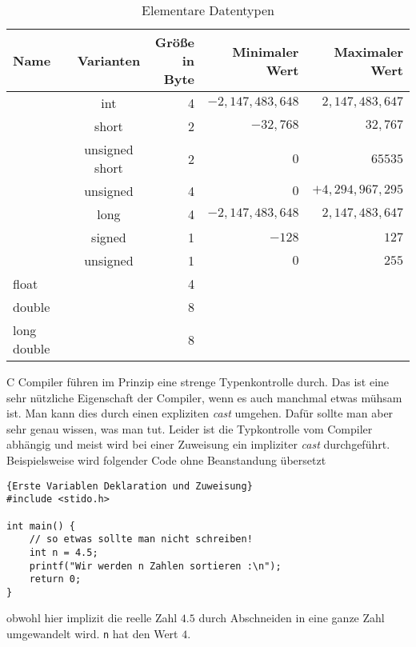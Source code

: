 \begin{table}[t]
\caption{Elementare Datentypen\label{tabelle1}}  %
\centering
\begin{tabular}{|l c c rrr|}
\hline
Name & & Varianten & Größe in Byte & Minimaler Wert & Maximaler Wert
\\[0.5ex]   
\hline %
                       & & int &4 & $-2,147,483,648$ & $2,147,483,647$ \\[-0.0ex]
                       & & short & 2 & $-32,768$ & $32,767$ \\[-0.0ex]
\raisebox{1ex}{int}  & & unsigned short& 2 & $0$ & $65535$ \\[-0.0ex]
                       & &unsigned& 4 & $0$ & $ +4,294,967,295$ \\[1ex]
                       & &long& 4 &  $-2,147,483,648$ & $2,147,483,647$ \\
\hline
                            & &signed & 1 & $-128$ & $127$ \\[-1ex]
\raisebox{1.5ex}{char} &    & unsigned &1 & $0$ & $255$  \\[1ex]
\hline
float & & & 4 &  &  \\
double& & & 8 &  &  \\
long double& & &8 &  &  \\[1ex]

\hline                          %
\end{tabular}
\label{tab:PPer}
\end{table}

C Compiler führen im Prinzip eine strenge Typenkontrolle durch.
Das ist eine sehr nützliche Eigenschaft der Compiler, wenn es auch manchmal etwas mühsam ist. 
Man kann dies durch einen expliziten \emph{cast} umgehen.
Dafür sollte man aber sehr genau wissen, was man tut.
Leider ist die Typkontrolle vom Compiler abhängig und meist wird bei einer Zuweisung ein impliziter \emph{cast} durchgeführt.
Beispielsweise wird folgender Code ohne Beanstandung übersetzt
\begin{lstlisting}{Erste Variablen Deklaration und Zuweisung}
#include <stido.h>

int main() {
    // so etwas sollte man nicht schreiben!
    int n = 4.5;
    printf("Wir werden n Zahlen sortieren :\n");
    return 0;
}
\end{lstlisting}
obwohl hier implizit die reelle Zahl $4.5$ durch Abschneiden in eine ganze Zahl umgewandelt wird.
\texttt{n} hat den Wert $4$.

